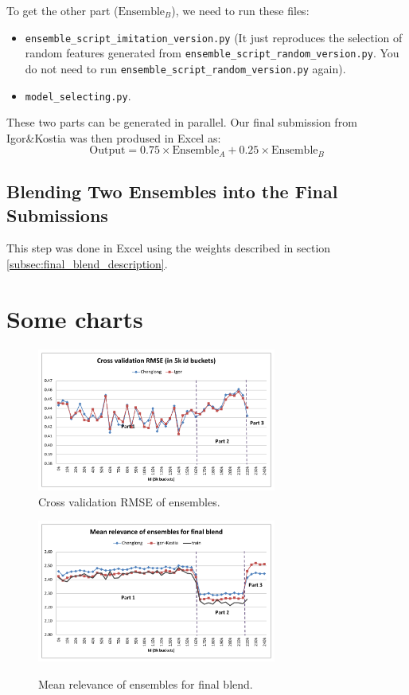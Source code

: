 \documentclass[12pt]{article}
\begin{document}
\begin{appendices}
To get the other part ($\text{Ensemble}_B$), we need to run these files:
\begin{itemize}
\item \texttt{ensemble\_script\_imitation\_version.py} (It just reproduces the selection of random features generated from \texttt{ensemble\_script\_random\_version.py}. You do not need to run \texttt{ensemble\_script\_random\_version.py} again).
\item \texttt{model\_selecting.py}.
\end{itemize}

These two parts can be generated in parallel. Our final submission from Igor\&Kostia was then prodused in Excel as:
$$\text{Output}=0.75\times \text{Ensemble}_A+ 0.25\times \text{Ensemble}_B$$


\subsection{Blending Two Ensembles into the Final Submissions}
This step was done in Excel using the weights described in section \ref{subsec:final_blend_description}.


\newpage
\section{Some charts}
\begin{figure}[h]
  \centering
\includegraphics[width=0.7\textwidth]{../Fig/plot_ensembles_performance.pdf}\\
  \caption{Cross validation RMSE of ensembles.}
  \label{Fig:ensembles_performance}
  \includegraphics[width=0.7\textwidth]{../Fig/plot_ensembles_means.pdf}\\
  \caption{Mean relevance of ensembles for final blend.}
  \label{Fig:ensembles_means}
\end{figure}


\end{appendices}
\end{document}
